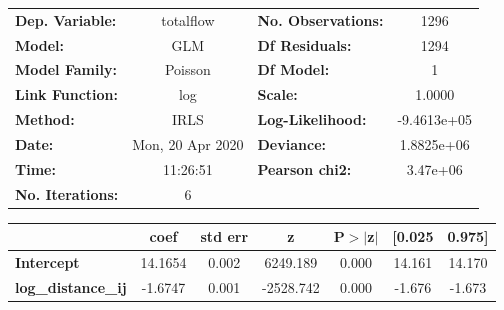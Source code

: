 \begin{center}
\begin{tabular}{lclc}
\toprule
\textbf{Dep. Variable:}    &    totalflow     & \textbf{  No. Observations:  } &      1296    \\
\textbf{Model:}            &       GLM        & \textbf{  Df Residuals:      } &      1294    \\
\textbf{Model Family:}     &     Poisson      & \textbf{  Df Model:          } &         1    \\
\textbf{Link Function:}    &       log        & \textbf{  Scale:             } &     1.0000   \\
\textbf{Method:}           &       IRLS       & \textbf{  Log-Likelihood:    } & -9.4613e+05  \\
\textbf{Date:}             & Mon, 20 Apr 2020 & \textbf{  Deviance:          } &  1.8825e+06  \\
\textbf{Time:}             &     11:26:51     & \textbf{  Pearson chi2:      } &   3.47e+06   \\
\textbf{No. Iterations:}   &        6         & \textbf{                     } &              \\
\bottomrule
\end{tabular}
\begin{tabular}{lcccccc}
                           & \textbf{coef} & \textbf{std err} & \textbf{z} & \textbf{P$> |$z$|$} & \textbf{[0.025} & \textbf{0.975]}  \\
\midrule
\textbf{Intercept}         &      14.1654  &        0.002     &  6249.189  &         0.000        &       14.161    &       14.170     \\
\textbf{log\_distance\_ij} &      -1.6747  &        0.001     & -2528.742  &         0.000        &       -1.676    &       -1.673     \\
\bottomrule
\end{tabular}
\end{center}